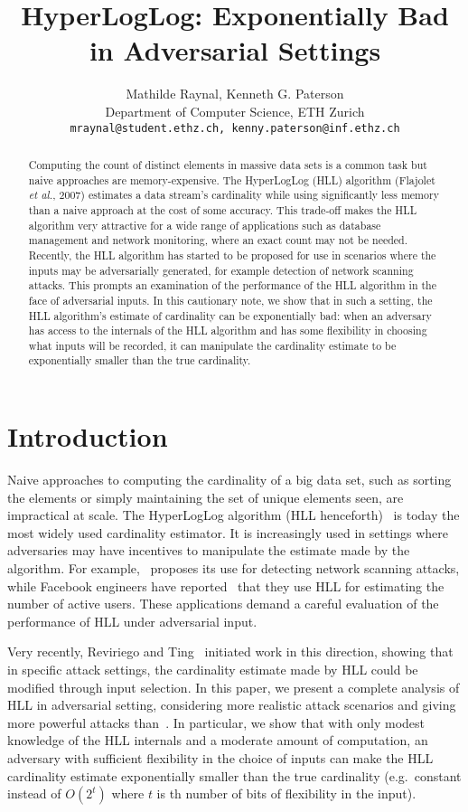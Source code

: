 \documentclass[11pt]{article}
\title{HyperLogLog: Exponentially Bad in Adversarial Settings}
\author{Mathilde Raynal, Kenneth G. Paterson\\
\vspace{3mm}
Department of Computer Science, ETH Zurich\\
{\tt mraynal@student.ethz.ch, kenny.paterson@inf.ethz.ch}}
\begin{document}
\maketitle

\begin{abstract}
Computing the count of distinct elements in massive data sets is a common task but naive approaches are memory-expensive. The HyperLogLog (HLL) algorithm (Flajolet \emph{et al.}, 2007) estimates a data stream's cardinality while using significantly less memory than a naive approach at the cost of some accuracy. This trade-off makes the HLL algorithm very attractive for a wide range of applications such as database management and network monitoring, where an exact count may not be needed. Recently, the HLL algorithm has started to be proposed for use in scenarios where the inputs may be adversarially generated, for example detection of network scanning attacks. This prompts an examination of the performance of the HLL algorithm in the face of adversarial inputs. In this cautionary note, we show that in such a setting, the HLL algorithm's estimate of cardinality can be exponentially bad: when an adversary has access to the internals of the HLL algorithm and has some flexibility in choosing what inputs will be recorded, it can manipulate the cardinality estimate to be exponentially smaller than the true cardinality.
\end{abstract}


\section{Introduction}
Naive approaches to computing the cardinality of a big data set, such as sorting the elements or simply maintaining the set of unique elements seen, are impractical at scale. The HyperLogLog algorithm (HLL henceforth)~\cite{hll} is today the most widely used cardinality estimator. It is increasingly used in settings where adversaries may have  incentives to manipulate the estimate made by the algorithm. For example,~\cite{portscanhll} proposes its use for detecting network scanning attacks, while Facebook engineers have reported~\cite{fbhll} that they use HLL for estimating the number of active users. These applications demand a careful evaluation of the performance of HLL under adversarial input.

Very recently, Reviriego and Ting~\cite{hllvuln} initiated work in this direction, showing that in specific attack settings, the cardinality estimate made by HLL could be modified through input selection. In this paper, we present a complete analysis of HLL in adversarial setting, considering more realistic attack scenarios and giving more powerful attacks than~\cite{hllvuln}. In particular, we show that with only modest knowledge of the HLL internals and a moderate amount of computation, an adversary with sufficient flexibility in the choice of inputs can make the HLL cardinality estimate exponentially smaller than the true cardinality (e.g.\ constant instead of $O(2^t)$ where $t$ is th number of bits of flexibility in the input).
\end{document}

